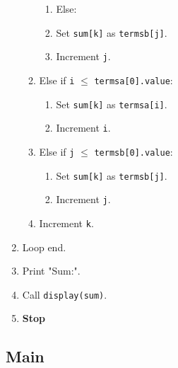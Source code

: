 \begin{enumerate}[label=\arabic*:,left=0pt]
\begin{enumerate}[label=4.\arabic*:]
\begin{enumerate}[label=4.1.\arabic*:]
              \item Else:
                  \item Set \texttt{sum[k]} as \texttt{termsb[j]}.
                  \item Increment \texttt{j}.
            \end{enumerate}
          \item Else if \texttt{i} $\leq$ \texttt{termsa[0].value}:
            \begin{enumerate}[label=4.2.\arabic*:]
              \item Set \texttt{sum[k]} as \texttt{termsa[i]}.
              \item Increment \texttt{i}.
            \end{enumerate}
          \item Else if \texttt{j} $\leq$ \texttt{termsb[0].value}:
            \begin{enumerate}[label=4.3.\arabic*:]
              \item Set \texttt{sum[k]} as \texttt{termsb[j]}.
              \item Increment \texttt{j}.
            \end{enumerate}
          \item Increment \texttt{k}.
        \end{enumerate}
      \item Loop end.
      \item Print "Sum:".
      \item Call \texttt{display(sum)}.
       \item \textbf{Stop}
\end{enumerate}

\subsection{Main}


